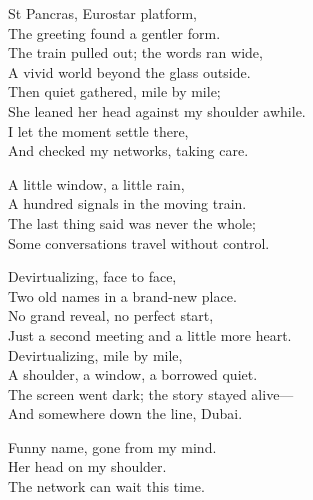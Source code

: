 \begin{lyrics}
St Pancras, Eurostar platform,\\
The greeting found a gentler form.\\
The train pulled out; the words ran wide,\\
A vivid world beyond the glass outside.\\
Then quiet gathered, mile by mile;\\
She leaned her head against my shoulder awhile.\\
I let the moment settle there,\\
And checked my networks, taking care.

A little window, a little rain,\\
A hundred signals in the moving train.\\
The last thing said was never the whole;\\
Some conversations travel without control.

Devirtualizing, face to face,\\
Two old names in a brand-new place.\\
No grand reveal, no perfect start,\\
Just a second meeting and a little more heart.\\
Devirtualizing, mile by mile,\\
A shoulder, a window, a borrowed quiet.\\
The screen went dark; the story stayed alive—\\
And somewhere down the line, Dubai.

Funny name, gone from my mind.\\
Her head on my shoulder.\\
The network can wait this time.
\end{lyrics}


